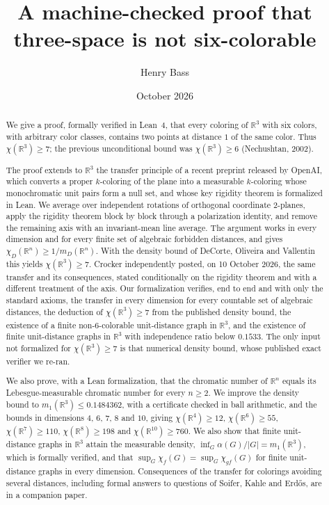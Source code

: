 \documentclass[11pt]{amsart}
\title[A machine-checked proof that three-space is not six-colorable]{A machine-checked proof that three-space is not six-colorable}
\author{Henry Bass}
\date{October 2026}
\theoremstyle{definition}
\newcommand{\R}{\mathbb{R}}
\begin{document}
\begin{abstract}
We give a proof, formally verified in Lean~4, that every coloring of $\R^3$ with six colors, with arbitrary color classes, contains two points at distance $1$ of the same color. Thus $\chi(\R^3)\ge7$; the previous unconditional bound was $\chi(\R^3)\ge6$ (Nechushtan, 2002).

The proof extends to $\R^3$ the transfer principle of a recent preprint released by OpenAI, which converts a proper $k$-coloring of the plane into a measurable $k$-coloring whose monochromatic unit pairs form a null set, and whose key rigidity theorem is formalized in Lean. We average over independent rotations of orthogonal coordinate $2$-planes, apply the rigidity theorem block by block through a polarization identity, and remove the remaining axis with an invariant-mean line average. The argument works in every dimension and for every finite set of algebraic forbidden distances, and gives $\chi_D(\R^n)\ge 1/m_D(\R^n)$. With the density bound of DeCorte, Oliveira and Vallentin this yields $\chi(\R^3)\ge7$. Crocker independently posted, on 10 October 2026, the same transfer and its consequences, stated conditionally on the rigidity theorem and with a different treatment of the axis. Our formalization verifies, end to end and with only the standard axioms, the transfer in every dimension for every countable set of algebraic distances, the deduction of $\chi(\R^3)\ge7$ from the published density bound, the existence of a finite non-$6$-colorable unit-distance graph in $\R^3$, and the existence of finite unit-distance graphs in $\R^3$ with independence ratio below $0.1533$. The only input not formalized for $\chi(\R^3)\ge7$ is that numerical density bound, whose published exact verifier we re-ran.

We also prove, with a Lean formalization, that the chromatic number of $\R^n$ equals its Lebesgue-measurable chromatic number for every $n\ge2$. We improve the density bound to $m_1(\R^3)\le0.1484362$, with a certificate checked in ball arithmetic, and the bounds in dimensions $4$, $6$, $7$, $8$ and $10$, giving $\chi(\R^4)\ge12$, $\chi(\R^6)\ge55$, $\chi(\R^7)\ge110$, $\chi(\R^8)\ge198$ and $\chi(\R^{10})\ge760$. We also show that finite unit-distance graphs in $\R^3$ attain the measurable density, $\inf_G\alpha(G)/|G|=m_1(\R^3)$, which is formally verified, and that $\sup_G\chi_f(G)=\sup_G\chi_{gf}(G)$ for finite unit-distance graphs in every dimension. Consequences of the transfer for colorings avoiding several distances, including formal answers to questions of Soifer, Kahle and Erd\H{o}s, are in a companion paper.
\end{abstract}
\maketitle
\end{document}
